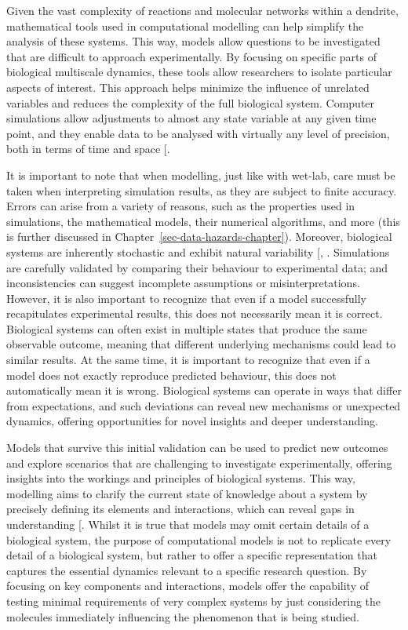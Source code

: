 \documentclass[
  11pt,
  letterpaper,
]{scrreprt}
\begin{document}
Given the vast complexity of reactions and molecular networks within a
dendrite, mathematical tools used in computational modelling can help
simplify the analysis of these systems. This way, models allow questions
to be investigated that are difficult to approach experimentally. By
focusing on specific parts of biological multiscale dynamics, these
tools allow researchers to isolate particular aspects of interest. This
approach helps minimize the influence of unrelated variables and reduces
the complexity of the full biological system. Computer simulations allow
adjustments to almost any state variable at any given time point, and
they enable data to be analysed with virtually any level of precision,
both in terms of time and space
{[}\citeproc{ref-levenstein2023Role}{248}{]}.

It is important to note that when modelling, just like with wet-lab,
care must be taken when interpreting simulation results, as they are
subject to finite accuracy. Errors can arise from a variety of reasons,
such as the properties used in simulations, the mathematical models,
their numerical algorithms, and more (this is further discussed in
Chapter~\ref{sec-data-hazards-chapter}). Moreover, biological systems
are inherently stochastic and exhibit natural variability
{[},
\citeproc{ref-demopoulos2025Chaos}{250}{]}. Simulations are carefully
validated by comparing their behaviour to experimental data; and
inconsistencies can suggest incomplete assumptions or
misinterpretations. However, it is also important to recognize that even
if a model successfully recapitulates experimental results, this does
not necessarily mean it is correct. Biological systems can often exist
in multiple states that produce the same observable outcome, meaning
that different underlying mechanisms could lead to similar results. At
the same time, it is important to recognize that even if a model does
not exactly reproduce predicted behaviour, this does not automatically
mean it is wrong. Biological systems can operate in ways that differ
from expectations, and such deviations can reveal new mechanisms or
unexpected dynamics, offering opportunities for novel insights and
deeper understanding.

Models that survive this initial validation can be used to predict new
outcomes and explore scenarios that are challenging to investigate
experimentally, offering insights into the workings and principles of
biological systems. This way, modelling aims to clarify the current
state of knowledge about a system by precisely defining its elements and
interactions, which can reveal gaps in understanding
{[}\citeproc{ref-szekely2014Stochastic}{251}{]}. Whilst it is true that
models may omit certain details of a biological system, the purpose of
computational models is not to replicate every detail of a biological
system, but rather to offer a specific representation that captures the
essential dynamics relevant to a specific research question. By focusing
on key components and interactions, models offer the capability of
testing minimal requirements of very complex systems by just considering
the molecules immediately influencing the phenomenon that is being
studied.
\end{document}

